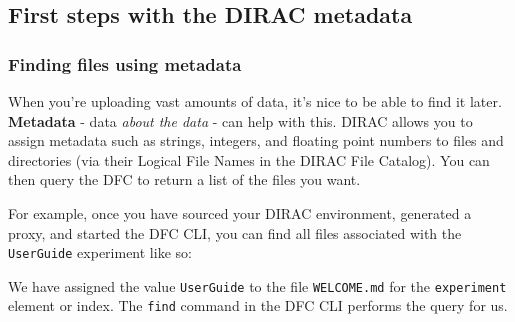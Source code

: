 \subsection{First steps with the DIRAC metadata}
\label{first-steps-with-the-dirac-metadata-functionality}

\subsubsection{Finding files using metadata}
\label{finding-files-using-metadata}
When you're uploading vast amounts of data, it's nice to be able to find
it later. \textbf{Metadata} - data \emph{about the data} - can help with
this. DIRAC allows you to assign metadata such as strings, integers, and
floating point numbers to files and directories (via their Logical File
Names in the DIRAC File Catalog). You can then query the DFC to return a
list of the files you want.

For example, once you have sourced your DIRAC environment, generated a
proxy, and started the DFC CLI, you can find all files associated with
the \texttt{UserGuide} experiment like so:

\begin{Shaded}
\begin{Highlighting}[]
\NormalTok{:/}\KeywordTok{>} 
\NormalTok{: \{}\NormalTok{: }\NormalTok{\}}
 
\end{Highlighting}
\end{Shaded}

We have assigned the value \texttt{UserGuide} to the file
\texttt{WELCOME.md} for the \texttt{experiment} element or index. The
\texttt{find} command in the DFC CLI performs the query for us.

\begin{Shaded}
\begin{Highlighting}[]
\NormalTok{:/}\KeywordTok{>} 
  
    
        \KeywordTok{<}\KeywordTok{>} \KeywordTok{<}\KeywordTok{>}\NormalTok{=}\KeywordTok{<}\KeywordTok{>} \NormalTok{[}\KeywordTok{<}\KeywordTok{>}\NormalTok{=}\KeywordTok{<}\KeywordTok{>}\NormalTok{]}
    
\NormalTok{:/}\KeywordTok{>} 
\end{Highlighting}
\end{Shaded}

